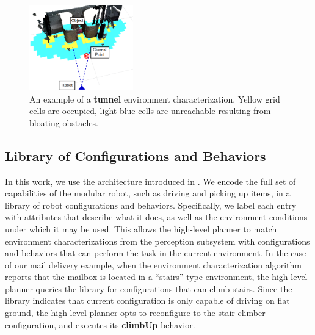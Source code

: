 \documentclass[journal]{IEEEtran}
\begin{document}
%
\begin{figure}
\begin{center}
\includegraphics[width=0.4\textwidth]{images/characterization.png}
\caption{An example of a \textbf{tunnel} environment characterization. Yellow grid cells are occupied, light blue cells are unreachable resulting from bloating obstacles.}
\label{fig:characterization}
\end{center}
\vspace{-2em}
\end{figure}

\subsection{Library of Configurations and Behaviors}
\label{sec:configuration-specifics}
%
In this work, we use the architecture introduced in \cite{Jing2016}. We encode the full set of capabilities of the modular robot, such as driving and picking up items, in a library of robot configurations and behaviors.
Specifically, we label each entry with attributes that describe what it does, as well as the environment conditions under which it may be used. 
This allows the high-level planner to match environment characterizations from the perception subsystem with configurations and behaviors that can perform the task in the current environment. 
In the case of our mail delivery example, when the environment characterization algorithm reports that the mailbox is located in a ``stairs''-type environment, the high-level planner queries the library for configurations that can climb stairs.  
Since the library indicates that current configuration is only capable of driving on flat ground, the high-level planner opts to reconfigure to the stair-climber configuration, and executes its \textbf{climbUp} behavior.
\end{document}
